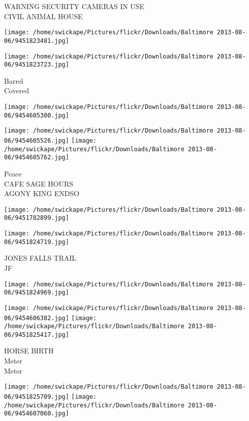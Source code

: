 \documentclass[10pt,letterpaper]{article}
\begin{document}
WARNING SECURITY CAMERAS IN USE\\
CIVIL ANIMAL HOUSE\\
\pagebreak

\texttt{[image: /home/swickape/Pictures/flickr/Downloads/Baltimore 2013-08-06/9451823481.jpg]}

\vspace{0.25in}
\texttt{[image: /home/swickape/Pictures/flickr/Downloads/Baltimore 2013-08-06/9451823723.jpg]}

Barrel\\
Covered\\
\pagebreak

\texttt{[image: /home/swickape/Pictures/flickr/Downloads/Baltimore 2013-08-06/9454605300.jpg]}

\vspace{0.25in}
\texttt{[image: /home/swickape/Pictures/flickr/Downloads/Baltimore 2013-08-06/9454605526.jpg]}
\texttt{[image: /home/swickape/Pictures/flickr/Downloads/Baltimore 2013-08-06/9454605762.jpg]}

Peace\\
CAFE SAGE HOURS\\
AGONY KING ENDSO\\
\pagebreak

\texttt{[image: /home/swickape/Pictures/flickr/Downloads/Baltimore 2013-08-06/9451782899.jpg]}

\vspace{0.25in}
\texttt{[image: /home/swickape/Pictures/flickr/Downloads/Baltimore 2013-08-06/9451824719.jpg]}

JONES FALLS TRAIL\\
JF\\
\pagebreak

\texttt{[image: /home/swickape/Pictures/flickr/Downloads/Baltimore 2013-08-06/9451824969.jpg]}

\vspace{0.25in}
\texttt{[image: /home/swickape/Pictures/flickr/Downloads/Baltimore 2013-08-06/9454606382.jpg]}
\texttt{[image: /home/swickape/Pictures/flickr/Downloads/Baltimore 2013-08-06/9451825417.jpg]}

HORSE BIRTH\\
Meter\\
Meter\\
\pagebreak

\texttt{[image: /home/swickape/Pictures/flickr/Downloads/Baltimore 2013-08-06/9451825709.jpg]}
\texttt{[image: /home/swickape/Pictures/flickr/Downloads/Baltimore 2013-08-06/9454607060.jpg]}
\end{document}
